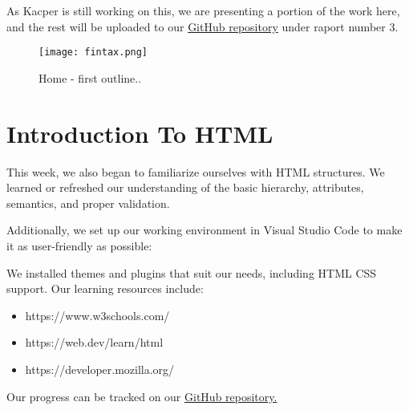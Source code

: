 \documentclass{article}
\begin{document}
As Kacper is still working on this, we are presenting a portion of the work here, and the rest will be uploaded to our \href{https://github.com/MurmiToJa/IT-Project}{GitHub repository}  under raport number 3.

\begin{figure}[h]
    \centering
    \texttt{[image: fintax.png]}
    \caption{Home - first outline..}
    \label{fig:enter-label}
\end{figure}


\section{Introduction To HTML}   
This week, we also began to familiarize ourselves with HTML structures. We learned or refreshed our understanding of the basic hierarchy, attributes, semantics, and proper validation.

Additionally, we set up our working environment in Visual Studio Code to make it as user-friendly as possible:

We installed themes and plugins that suit our needs, including HTML CSS support.
Our learning resources include:


\begin{itemize}
    \item https://www.w3schools.com/
    \item https://web.dev/learn/html
    \item https://developer.mozilla.org/
\end{itemize}

Our progress can be tracked on our \href{https://github.com/MurmiToJa/IT-Project}{GitHub repository.} 
\end{document}

